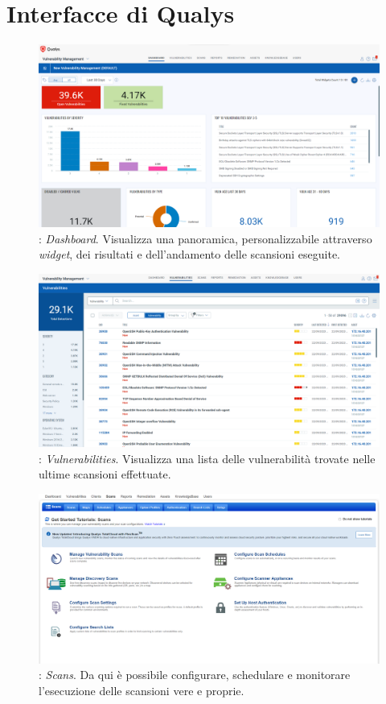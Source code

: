 \documentclass[target=bach,aauheader=]{thud}
\begin{document}
\chapter{Interfacce di Qualys}
\label{appendix:a}

\begin{figure}[h]
\centering
    \includegraphics[scale=0.329]{images/qualys_dashboard.png}
    \caption{: \textit{Dashboard}. Visualizza una panoramica, personalizzabile attraverso \textit{widget}, dei risultati e dell'andamento delle scansioni eseguite.}
\end{figure}

\begin{figure}
\centering
\includegraphics[scale=0.329]{images/qualys_vuln.png}
    \caption{: \textit{Vulnerabilities}. Visualizza una lista delle vulnerabilità trovate nelle ultime scansioni effettuate.}
\end{figure}

\begin{figure}
\centering
\includegraphics[scale=0.329]{images/qualys_scans.png}
    \caption{: \textit{Scans}. Da qui è possibile configurare, schedulare e monitorare l'esecuzione delle scansioni vere e proprie.}
\end{figure}
\end{document}
